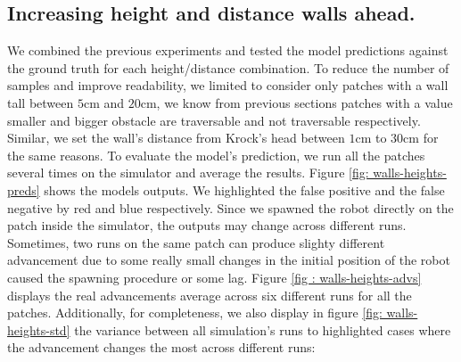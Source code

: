 \documentclass[../document.tex]{subfiles}
\begin{document}
\subsection{Increasing height and distance walls ahead.}
We combined the previous experiments and tested the model predictions against the ground truth for each height/distance combination. To reduce the number of samples and improve readability, we limited to consider only patches with a wall tall between $5$cm and $20$cm, we know from previous sections patches with a value smaller and bigger obstacle are traversable and not traversable respectively. Similar, we set the wall's distance from Krock's head between $1$cm to $30$cm for the same reasons. To evaluate the model's prediction, we run all the patches several times on the simulator and average the results. Figure \ref{fig:  walls-heights-preds} shows the models outputs. We highlighted the false positive and the false negative by red and blue respectively.  Since we spawned the robot directly on the patch inside the simulator, the outputs may change across different runs. Sometimes, two runs on the same patch can produce slighty different advancement due to some really small changes in the initial position of the robot caused the spawning procedure or some lag. Figure \ref{fig : walls-heights-advs} displays the real advancements average across six different runs for all the patches. Additionally, for completeness, we also display in figure \ref{fig: walls-heights-std} the variance between all simulation's runs to highlighted cases where the advancement changes the most across different runs:  
\end{document}
